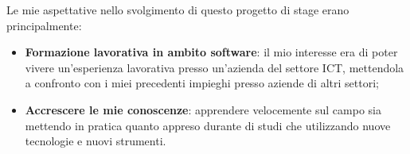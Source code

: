 Le mie aspettative nello svolgimento di questo progetto di stage erano principalmente:
\begin{itemize}
\item \textbf{Formazione lavorativa in ambito software}: il mio interesse era di poter vivere un'esperienza lavorativa presso un'azienda del settore ICT, mettendola a confronto con i miei precedenti impieghi presso aziende di altri settori;
\item \textbf{Accrescere le mie conoscenze}: apprendere velocemente sul campo sia mettendo in pratica quanto appreso durante di studi che utilizzando nuove tecnologie e nuovi strumenti.
\end{itemize}


